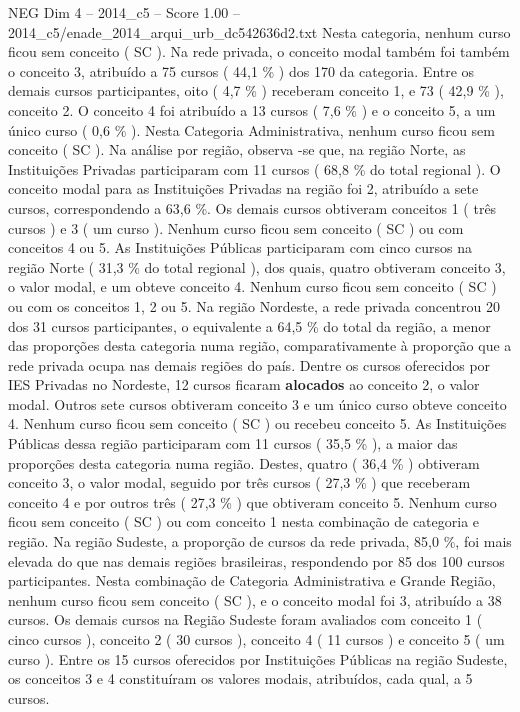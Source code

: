 \begin{textsample}{NEG Dim 4 – 2014\_c5 – Score 1.00 – 2014\_c5/enade\_2014\_arqui\_urb\_dc542636d2.txt}
Nesta categoria, nenhum curso ficou sem conceito ( SC ).
Na rede privada, o conceito modal também foi também o conceito 3, atribuído a 75 cursos ( 44,1 \% ) dos 170 da categoria.
Entre os demais cursos participantes, oito ( 4,7 \% ) receberam conceito 1, e 73 ( 42,9 \% ), conceito 2.
O conceito 4 foi atribuído a 13 cursos ( 7,6 \% ) e o conceito 5, a um único curso ( 0,6 \% ).
Nesta Categoria Administrativa, nenhum curso ficou sem conceito ( SC ).
Na análise por região, observa -se que, na região Norte, as Instituições Privadas participaram com 11 cursos ( 68,8 \% do total regional ).
O conceito modal para as Instituições Privadas na região foi 2, atribuído a sete cursos, correspondendo a 63,6 \%.
Os demais cursos obtiveram conceitos 1 ( três cursos ) e 3 ( um curso ).
Nenhum curso ficou sem conceito ( SC ) ou com conceitos 4 ou 5.
As Instituições Públicas participaram com cinco cursos na região Norte ( 31,3 \% do total regional ), dos quais, quatro obtiveram conceito 3, o valor modal, e um obteve conceito 4.
Nenhum curso ficou sem conceito ( SC ) ou com os conceitos 1, 2 ou 5.
Na região Nordeste, a rede privada concentrou 20 dos 31 cursos participantes, o equivalente a 64,5 \% do total da região, a menor das proporções desta categoria numa região, comparativamente à proporção que a rede privada ocupa nas demais regiões do país.
Dentre os cursos oferecidos por IES Privadas no Nordeste, 12 cursos ficaram \textbf{alocados} ao conceito 2, o valor modal.
Outros sete cursos obtiveram conceito 3 e um único curso obteve conceito 4.
Nenhum curso ficou sem conceito ( SC ) ou recebeu conceito 5.
As Instituições Públicas dessa região participaram com 11 cursos ( 35,5 \% ), a maior das proporções desta categoria numa região.
Destes, quatro ( 36,4 \% ) obtiveram conceito 3, o valor modal, seguido por três cursos ( 27,3 \% ) que receberam conceito 4 e por outros três ( 27,3 \% ) que obtiveram conceito 5.
Nenhum curso ficou sem conceito ( SC ) ou com conceito 1 nesta combinação de categoria e região.
Na região Sudeste, a proporção de cursos da rede privada, 85,0 \%, foi mais elevada do que nas demais regiões brasileiras, respondendo por 85 dos 100 cursos participantes.
Nesta combinação de Categoria Administrativa e Grande Região, nenhum curso ficou sem conceito ( SC ), e o conceito modal foi 3, atribuído a 38 cursos.
Os demais cursos na Região Sudeste foram avaliados com conceito 1 ( cinco cursos ), conceito 2 ( 30 cursos ), conceito 4 ( 11 cursos ) e conceito 5 ( um curso ).
Entre os 15 cursos oferecidos por Instituições Públicas na região Sudeste, os conceitos 3 e 4 constituíram os valores modais, atribuídos, cada qual, a 5 cursos.

\end{textsample}
